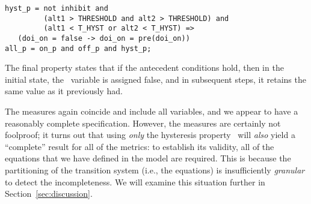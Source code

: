 {\smaller
\begin{verbatim}
hyst_p = not inhibit and
         (alt1 > THRESHOLD and alt2 > THRESHOLD) and
         (alt1 < T_HYST or alt2 < T_HYST) =>
   (doi_on = false -> doi_on = pre(doi_on))
all_p = on_p and off_p and hyst_p;
\end{verbatim}
}
\noindent The final property states that if the antecedent conditions hold, then in the initial state, the \doion\ variable is assigned false, and in subsequent steps, it retains the same value as it previously had.

The measures again coincide and include all variables, and we appear to have a reasonably complete specification.  However, the measures are certainly not foolproof; it turns out that using {\em only} the hysteresis property \hystp\ will {\em also} yield a ``complete'' result for all of the metrics: to establish its validity, all of the equations that we have defined in the model are required.  This is because the partitioning of the transition system (i.e., the equations) is insufficiently {\em granular} to detect the incompleteness.
We will examine this situation further in Section~\ref{sec:discussion}.
%
